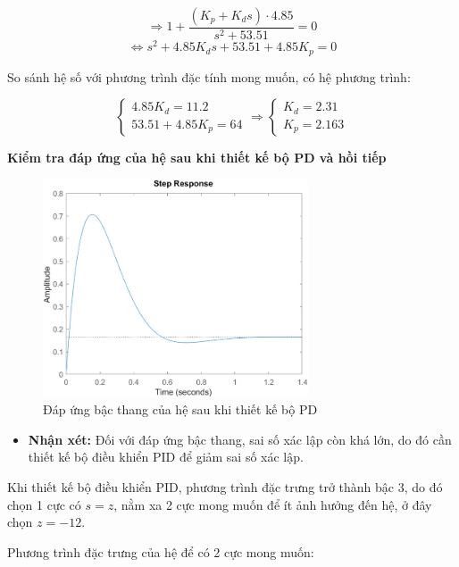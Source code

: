     \[
    \Rightarrow 1 + \frac{(K_p + K_d s) \cdot 4.85}{s^2 + 53.51} = 0
    \]
    \[
    \Leftrightarrow s^2 + 4.85K_d s + 53.51 + 4.85K_p = 0
    \]

    So sánh hệ số với phương trình đặc tính mong muốn, có hệ phương trình:

    \[
    \begin{cases}
    4.85K_d = 11.2 \\
    53.51 + 4.85K_p = 64
    \end{cases}
    \Rightarrow
    \begin{cases}
    K_d = 2.31 \\
    K_p = 2.163
    \end{cases}
    \]

    \textbf{Kiểm tra đáp ứng của hệ sau khi thiết kế bộ PD và hồi tiếp}

    \begin{figure}[H]
        \centering
        \includegraphics[width=0.7\textwidth]{pictures/PD.png} %
        \caption{Đáp ứng bậc thang của hệ sau khi thiết kế bộ PD}
    \end{figure}

    \begin{itemize}
        \item \textbf{Nhận xét:} Đối với đáp ứng bậc thang, sai số xác lập còn khá lớn, do đó cần thiết kế bộ điều khiển PID để giảm sai số xác lập.
    \end{itemize}

    Khi thiết kế bộ điều khiển PID, phương trình đặc trưng trở thành bậc 3, do đó chọn 1 cực có $s = z$, nằm xa 2 cực mong muốn để ít ảnh hưởng đến hệ, ở đây chọn $z = -12$.

    Phương trình đặc trưng của hệ để có 2 cực mong muốn:

